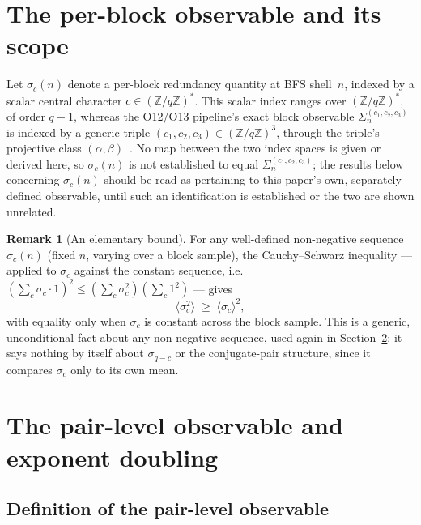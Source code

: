 \documentclass[11pt,a4paper]{article}
\theoremstyle{definition}
\newtheorem{remark}[theorem]{Remark}
\newcommand{\ZqZ}{\mathbb{Z}/q\mathbb{Z}}
\newcommand{\Fq}{(\mathbb{Z}/q\mathbb{Z})^*}
\begin{document}
  \section{The per-block observable and its scope}
  \label{sec:sigma_symmetry}

  Let $\sigma_c(n)$ denote a per-block redundancy quantity at BFS
  shell~$n$, indexed by a scalar central character $c \in \Fq$.
  This scalar index ranges over $\Fq$, of order $q-1$, whereas the
  O12/O13 pipeline's exact block observable $\Sigma_n^{(c_1,c_2,c_3)}$
  is indexed by a generic triple $(c_1,c_2,c_3) \in (\ZqZ)^3$, through
  the triple's projective class $(\alpha,\beta)$~\cite{Beau2026a16,Beau2026a17}.
  No map between the two index spaces is given or derived here, so
  $\sigma_c(n)$ is not established to equal
  $\Sigma_n^{(c_1,c_2,c_3)}$; the results below concerning $\sigma_c(n)$
  should be read as pertaining to this paper's own, separately defined
  observable, until such an identification is established or the two are
  shown unrelated.

  \begin{remark}[An elementary bound]
    \label{rem:cs-bound}
For any well-defined non-negative sequence $\sigma_c(n)$ (fixed $n$,
varying over a block sample), the Cauchy--Schwarz inequality --- applied
to $\sigma_c$ against the constant sequence, i.e.\
$(\sum_c \sigma_c\cdot1)^2 \leq (\sum_c\sigma_c^2)(\sum_c 1^2)$ --- gives
\begin{equation}
  \langle\sigma_c^2\rangle \;\geq\; \langle\sigma_c\rangle^2,
  \label{eq:cs-correct}
\end{equation}
with equality only when $\sigma_c$ is constant across the block sample.
This is a generic, unconditional fact about any non-negative sequence,
used again in Section~\ref{sec:doubling}; it says nothing by itself
about $\sigma_{q-c}$ or the conjugate-pair structure, since it compares
$\sigma_c$ only to its own mean.
  \end{remark}

  \section{The pair-level observable and exponent doubling}
  \label{sec:doubling}

  \subsection{Definition of the pair-level observable}
\end{document}
